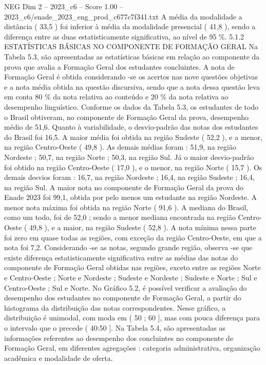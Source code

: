 \begin{textsample}{NEG Dim 2 – 2023\_c6 – Score 1.00 – 2023\_c6/enade\_2023\_eng\_prod\_c677c7f341.txt}
A média da modalidade a distância ( 33,5 ) foi inferior à média da modalidade presencial ( 41,8 ), sendo a diferença entre as duas estatisticamente significativa, ao nível de 95 \%. 5.1.2 ESTATÍSTICAS BÁSICAS NO COMPONENTE DE FORMAÇÃO GERAL Na Tabela 5.3, são apresentadas as estatísticas básicas em relação ao componente da prova que avalia a Formação Geral dos estudantes concluintes.
A nota de Formação Geral é obtida considerando -se os acertos nas nove questões objetivas e a nota média obtida na questão discursiva, sendo que a nota dessa questão leva em conta 80 \% da nota relativa ao conteúdo e 20 \% da nota relativa ao desempenho linguístico.
Conforme os dados da Tabela 5.3, os estudantes de todo o Brasil obtiveram, no componente de Formação Geral da prova, desempenho médio de 51,6.
Quanto à variabilidade, o desvio-padrão das notas dos estudantes do Brasil foi 16,5.
A maior média foi obtida na região Sudeste ( 52,2 ), e a menor, na região Centro-Oeste ( 49,8 ).
As demais médias foram : 51,9, na região Nordeste ; 50,7, na região Norte ; 50,3, na região Sul.
Já o maior desvio-padrão foi obtido na região Centro-Oeste ( 17,0 ), e o menor, na região Norte ( 15,7 ).
Os demais desvios foram : 16,7, na região Nordeste ; 16,4, na região Sudeste ; 16,4, na região Sul.
A maior nota no componente de Formação Geral da prova do Enade 2023 foi 99,1, obtida por pelo menos um estudante na região Nordeste.
A menor nota máxima foi obtida na região Norte ( 91,6 ).
A mediana do Brasil, como um todo, foi de 52,0 ; sendo a menor mediana encontrada na região Centro-Oeste ( 49,8 ), e a maior, na região Sudeste ( 52,8 ).
A nota mínima nessa parte foi zero em quase todas as regiões, com exceção da região Centro-Oeste, em que a nota foi 7,2.
Considerando -se as notas, segundo grande região, observa -se que existe diferença estatisticamente significativa entre as médias das notas do componente de Formação Geral obtidas nas regiões, exceto entre as regiões Norte e Centro-Oeste ; Norte e Nordeste ; Sudeste e Nordeste ; Sudeste e Norte ; Sul e Centro-Oeste ; Sul e Norte.
No Gráfico 5.2, é possível verificar a avaliação do desempenho dos estudantes no componente de Formação Geral, a partir do histograma da distribuição das notas correspondentes.
Nesse gráfico, a distribuição é unimodal, com moda em ( 50 ; 60 ], mas com pouca diferença para o intervalo que o precede ( 40:50 ].
Na Tabela 5.4, são apresentadas as informações referentes ao desempenho dos concluintes no componente de Formação Geral, em diferentes agregações : categoria administrativa, organização acadêmica e modalidade de oferta.

\end{textsample}
